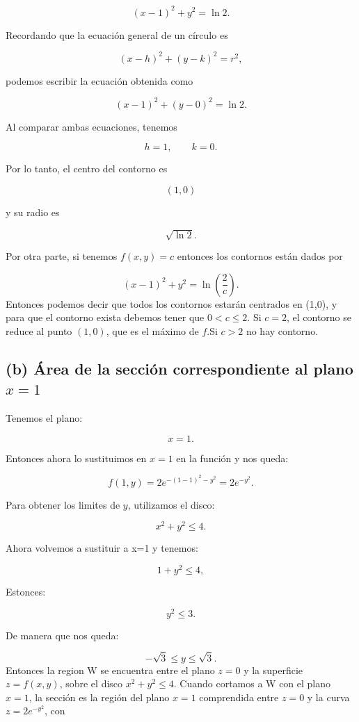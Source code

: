 \begin{respuesta}
\[
(x-1)^2+y^2=\ln 2.
\]

Recordando que la ecuación general de un círculo es

\[
(x-h)^2+(y-k)^2=r^2,
\]

podemos escribir la ecuación obtenida como

\[
(x-1)^2+(y-0)^2=\ln 2.
\]

Al comparar ambas ecuaciones, tenemos

\[
h=1,\qquad k=0.
\]

Por lo tanto, el centro del contorno es

\[
{(1,0)}
\]

y su radio es

\[
{\sqrt{\ln 2}}.
\]


Por otra parte, si tenemos \(f(x,y)=c\) entonces los contornos están dados por

\[
(x-1)^2+y^2=\ln\left(\frac{2}{c}\right).
\]
Entonces podemos decir que todos los contornos estarán centrados en (1,0), y para que el contorno exista debemos tener que \(0<c\leq 2\). Si \(c=2\), el contorno se reduce al punto \((1,0)\), que es el máximo de \(f\).Si \(c>2\) no hay contorno.

\subsection*{(b) Área de la sección correspondiente al plano \(x=1\)}

Tenemos el plano: 

\[
x=1.
\]

Entonces ahora lo sustituimos en \(x=1\) en la función y nos queda: 

\[
f(1,y)=2e^{-(1-1)^2-y^2}
=2e^{-y^2}.
\]

Para obtener los limites de \(y\), utilizamos el disco: 

\[
x^2+y^2\leq4.
\]

Ahora volvemos a sustituir a x=1 y tenemos: 

\[
1+y^2\leq4,
\]

Estonces: 

\[
y^2\leq3.
\]

De manera que nos queda: 

\[
-\sqrt{3}\leq y\leq\sqrt{3}.
\]
Entonces la region W se encuentra entre el plano \(z=0\) y la superficie \(z=f(x,y)\), sobre el disco \(x^2+y^2\leq4\).
Cuando cortamos a W con el plano \(x=1\), la sección es la región del plano \(x=1\) comprendida entre \(z=0\) y la curva \(z=2e^{-y^2}\), con


\end{respuesta}
